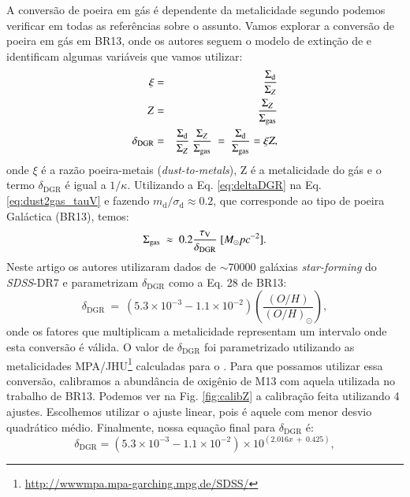 A conversão de poeira em gás é dependente da metalicidade segundo podemos verificar em todas as
referências sobre o assunto. Vamos explorar a conversão de poeira em gás em BR13, onde os autores
seguem o modelo de extinção de \citet{Charlot.Fall.2000a} e identificam algumas variáveis que vamos
utilizar:
\begin{eqnarray}
	\xi &=& \frac{\Sigma_{\mathrm{d}}}{\Sigma_Z} \\
	Z &=& \frac{\Sigma_Z}{\Sigma_{\mathrm{gas}}}  \\
	\delta_{\mathrm{DGR}} &=& \frac{\Sigma_{\mathrm{d}}}{\Sigma_Z}\ \frac{\Sigma_Z}{\Sigma_{\mathrm{gas}}}\ =\
\frac{\Sigma_{\mathrm{d}}}{\Sigma_{\mathrm{gas}}} = \xi Z,
	\label{eq:deltaDGR}
\end{eqnarray}
\noindent onde $\xi$ é a razão poeira-metais ({\em dust-to-metals}), Z é a metalicidade do gás e o
termo $\delta_{\mathrm{DGR}}$ é igual a $1/\kappa$. Utilizando a Eq. \ref{eq:deltaDGR} na Eq.
\ref{eq:dust2gas_tauV} e fazendo $m_{\mathrm{d}}/\sigma_{\mathrm{d}} \approx 0.2$, que corresponde
ao tipo de poeira Galáctica (BR13), temos:
\begin{equation}
	\Sigma_{\mathrm{gas}}\ \approx\ 0.2 \frac{\tau_{\mathrm{V}}}{\delta_{\mathrm{DGR}}}\ [M_\odot pc^{-2}].
	\label{eq:SigmaGasBR}
\end{equation}
Neste artigo os autores utilizaram dados de $\sim 70000$ galáxias {\em star-forming} do
\textit{SDSS}-DR7 e parametrizam $\delta_{\mathrm{DGR}}$ como a Eq. 28 de BR13:
\begin{equation}
	\delta_{\mathrm{DGR}}\ =\ (5.3 \times 10^{-3} - 1.1 \times 10^{-2})
\left(\frac{(O/H)}{(O/H)_\odot}\right),
	\label{eq:DGR_brinch_eq28}
\end{equation}
\noindent onde os fatores que multiplicam a metalicidade representam um intervalo onde esta
conversão é válida. O valor de $\delta_{\mathrm{DGR}}$ foi parametrizado utilizando as metalicidades
MPA/JHU\footnote{\href{http://wwwmpa.mpa-garching.mpg.de/SDSS/}{http://wwwmpa.mpa-garching.mpg.de/SDSS/}}
calculadas para o \SDSS. Para que possamos utilizar essa conversão, calibramos a abundância de
oxigênio de M13 com aquela utilizada no trabalho de BR13. Podemos ver na Fig. \ref{fig:calibZ} a
calibração feita utilizando 4 ajustes. Escolhemos utilizar o ajuste linear, pois é aquele com menor
desvio quadrático médio. Finalmente, nossa equação final para $\delta_{\mathrm{DGR}}$ é:
\begin{equation}
	\delta_{\mathrm{DGR}} =  (5.3 \times 10^{-3} - 1.1 \times 10^{-2}) \times 10^{\left(2.016 x\ +\ 0.425\right)},
	\label{eq:myDGR}
\end{equation}
